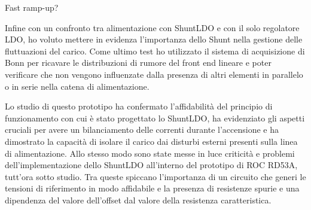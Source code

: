 Fast ramp-up?

Infine con un confronto tra alimentazione con ShuntLDO e con il solo regolatore LDO, ho voluto mettere in evidenza l'importanza dello Shunt nella gestione delle fluttuazioni del carico. 
Come ultimo test ho utilizzato il sistema di acquisizione di Bonn per ricavare le distribuzioni di rumore del front end lineare e poter verificare che non vengono influenzate dalla presenza di altri elementi in parallelo o in serie nella catena di alimentazione. 

Lo studio di questo prototipo ha confermato l'affidabilità del principio di funzionamento con cui è stato progettato lo ShuntLDO, ha evidenziato gli aspetti cruciali per avere un bilanciamento delle correnti durante l'accensione e ha dimostrato la capacità di isolare il carico dai disturbi esterni presenti sulla linea di alimentazione.
Allo stesso modo sono state messe in luce criticità e problemi dell'implementazione dello ShuntLDO all'interno del prototipo di ROC RD53A, tutt'ora sotto studio. Tra queste spiccano l'importanza di un circuito che generi le tensioni di riferimento in modo affidabile e la presenza di resistenze spurie e una dipendenza del valore dell'offset dal valore della resistenza caratteristica. 





